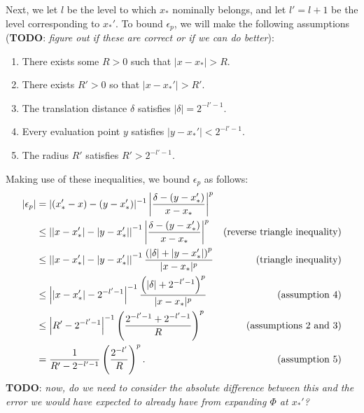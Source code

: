 Next, we let $l$ be the level to which $x_*$ nominally belongs, and
let $l' = l + 1$ be the level corresponding to $x_*'$. To bound
$\epsilon_p$, we will make the following assumptions (\textbf{TODO}: \emph{figure out
  if these are correct or if we can do better}):
\begin{enumerate}
\item There exists some $R > 0$ such that $|x - x_*| > R$.
\item There exists $R' > 0$ so that $|x - x_*'| > R'$.
\item The translation distance $\delta$ satisfies $|\delta| = 2^{-l'-1}$.
\item Every evaluation point $y$ satisfies $|y - x_*'| < 2^{-l'-1}$.
\item The radius $R'$ satisfies $R' > 2^{-l'-1}$.
\end{enumerate}
Making use of these inequalities, we bound $\epsilon_p$ as follows:
\begin{align*}
  |\epsilon_p|
  &= |(x_*' - x) - (y - x_*')|^{-1} \left|\frac{\delta - (y - x_*')}{x - x_*}\right|^p \\
  &\leq \left|\left|x - x_*'\right| - \left|y - x_*'\right|\right|^{-1} \left|\frac{\delta - (y - x_*')}{x - x_*}\right|^p & \mbox{(reverse triangle inequality)} \\
  &\leq \left|\left|x - x_*'\right| - \left|y - x_*'\right|\right|^{-1} \frac{\left(|\delta| + |y - x_*'|\right)^p}{|x - x_*|^p} & \mbox{(triangle inequality)} \\
  &\leq \left|\left|x - x_*'\right| - 2^{-l'-1}\right|^{-1} \frac{\left(|\delta| + 2^{-l'-1}\right)^p}{|x - x_*|^p} & \mbox{(assumption 4)} \\
  &\leq \left|R' - 2^{-l'-1}\right|^{-1} \left(\frac{2^{-l'-1} + 2^{-l'-1}}{R}\right)^p & \mbox{(assumptions 2 and 3)} \\
  &= \frac{1}{R' - 2^{-l'-1}} \left(\frac{2^{-l'}}{R}\right)^p. & \mbox{(assumption 5)}
\end{align*}
\textbf{TODO}: \emph{now, do we need to consider the absolute difference between this and the error we would have expected to already have from expanding $\Phi$ at $x_*'$?}


